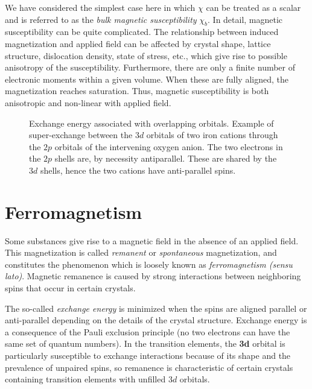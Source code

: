 We have considered the simplest case here in which  $\chi$ can be treated as 
a scalar and is referred to as  the
%
{\it bulk magnetic susceptibility} $\chi_b$.
In detail, magnetic susceptibility can be quite complicated. 
The relationship
between induced magnetization and applied field can be
affected by crystal shape, lattice
structure, dislocation density, state of stress, etc., 
which give rise to possible anisotropy of the susceptibility.
Furthermore, there are only a finite number of electronic moments within
a given volume.  When these are fully aligned, the magnetization reaches
saturation.  Thus, magnetic susceptibility is both anisotropic and non-linear
with applied field.


\begin{figure}[htb]
\epsfxsize 10cm
\centering {}
\caption{ Exchange energy associated with overlapping orbitals.  Example of super-exchange between the $3d$ orbitals of two iron cations through the $2p$ orbitals of the intervening oxygen anion.  The  two electrons in the $2p$ shells are, by necessity antiparallel.  These are shared by the $3d$ shells, hence the two cations have anti-parallel spins. }
\label{fig:exchange}
\end{figure}



\section {Ferromagnetism}
\label{sect:ferro}

Some substances give rise to a magnetic field in the absence of an applied field. 
This magnetization  is called {\it remanent } or
%
 {\it spontaneous} magnetization, and constitutes the  
phenomenon which is loosely known as
%
{\it ferromagnetism (sensu lato)}. 
 Magnetic remanence is caused by
strong interactions between neighboring spins that occur in certain
crystals.  

The so-called
%
{\it exchange energy} is minimized when the spins
are aligned parallel or anti-parallel depending on the details of the crystal
structure.  
Exchange energy is a consequence of the Pauli exclusion principle (no two electrons can have the same set of quantum numbers).  
In the transition elements, the {\bf 3d} orbital is particularly 
susceptible to exchange interactions because of
its shape and the prevalence of unpaired spins, 
 so remanence is characteristic of
certain crystals containing transition elements with unfilled {$ 3d$} orbitals.  

